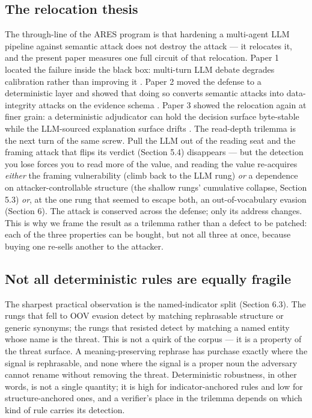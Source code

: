 \documentclass[sigconf,anonymous,review]{acmart}
\begin{document}
\subsection{The relocation thesis}
The through-line of the ARES program is that hardening a multi-agent LLM pipeline against semantic attack does not destroy the attack --- it relocates it, and the present paper measures one full circuit of that relocation. Paper 1 located the failure inside the black box: multi-turn LLM debate degrades calibration rather than improving it \citep{gmys-casiano-2026a}. Paper 2 moved the defense to a deterministic layer and showed that doing so converts semantic attacks into data-integrity attacks on the evidence schema \citep{gmys-casiano-2026b}. Paper 3 showed the relocation again at finer grain: a deterministic adjudicator can hold the decision surface byte-stable while the LLM-sourced explanation surface drifts \citep{gmys-casiano-2026c}. The read-depth trilemma is the next turn of the same screw. Pull the LLM out of the reading seat and the framing attack that flips its verdict (Section 5.4) disappears --- but the detection you lose forces you to read more of the value, and reading the value re-acquires \textit{either} the framing vulnerability (climb back to the LLM rung) \textit{or} a dependence on attacker-controllable structure (the shallow rungs' cumulative collapse, Section 5.3) \textit{or}, at the one rung that seemed to escape both, an out-of-vocabulary evasion (Section 6). The attack is conserved across the defense; only its address changes. This is why we frame the result as a trilemma rather than a defect to be patched: each of the three properties can be bought, but not all three at once, because buying one re-sells another to the attacker.


\subsection{Not all deterministic rules are equally fragile}
The sharpest practical observation is the named-indicator split (Section 6.3). The rungs that fell to OOV evasion detect by matching rephrasable structure or generic synonyms; the rungs that resisted detect by matching a named entity whose name is the threat. This is not a quirk of the corpus --- it is a property of the threat surface. A meaning-preserving rephrase has purchase exactly where the signal is rephrasable, and none where the signal is a proper noun the adversary cannot rename without removing the threat. Deterministic robustness, in other words, is not a single quantity; it is high for indicator-anchored rules and low for structure-anchored ones, and a verifier's place in the trilemma depends on which kind of rule carries its detection.
\end{document}
